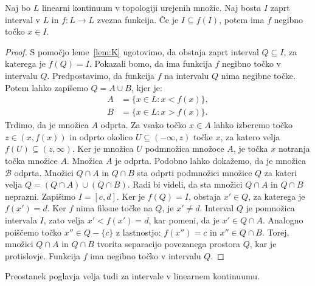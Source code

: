 \documentclass[../TG_magistrsko_delo_sections.tex]{subfiles}
\begin{document}
\begin{lema}
Naj bo $L$ linearni kontinuum v topologiji urejenih množic. Naj bosta $I$ zaprt interval v $L$ in $f:L \to L$ zvezna funkcija. Če je $I \subseteq f(I)$, potem ima $f$ negibno točko $x \in I$.
\end{lema}
\begin{proof}
S pomočjo leme~\ref{lem:K} ugotovimo, da obstaja zaprt interval $Q \subseteq I$, za katerega je $f(Q) = I$. Pokazali bomo, da ima funkcija $f$ negibno točko v intervalu $Q$. Predpostavimo, da funkcija $f$ na intervalu $Q$ nima negibne točke. Potem lahko zapišemo $Q = A \cup B$, kjer je:
\begin{equation*} %
\begin{split}
A &= \{x \in L : x < f(x)\}, \\ 
B &= \{x \in L : x > f(x)\}.
\end{split}
\end{equation*}
Trdimo, da je množica $A$ odprta. Za vsako točko $x \in A$ lahko izberemo točko $z \in (x, f(x))$ in odprto okolico $U \subseteq  (-\infty, z)$ točke $x$, za katero velja $f(U) \subseteq (z, \infty)$. Ker je množica $U$ podmnožica množoce $A$, je točka $x$ notranja točka množice $A$. Množica $A$ je odprta. Podobno lahko dokažemo, da je množica $\mathcal{B}$ odprta. Množici $Q \cap A$ in $Q \cap B$ sta odprti podmnožici množice $Q$ za kateri velja $Q = (Q \cap A) \cup (Q \cap B)$. Radi bi videli, da sta množici $Q \cap A$ in $Q \cap B$ neprazni. Zapišimo $I = [c, d]$. Ker je $f(Q) = I$, obstaja $x' \in Q$, za katerega je $f(x') =d$. Ker $f$ nima fiksne točke na $Q$, je $x' \neq d$. Interval $Q$ je pomnožica intervala $I$, zato velja $x' < f(x') = d$, kar pomeni, da je $x' \in Q \cap A$. Analogno poiščemo točko $x'' \in Q - \{c\}$ z lastnostjo: $f(x'') = c$ in $x'' \in Q \cap B$. Torej, množici $Q \cap A$ in $Q \cap B$ tvorita separacijo povezanega prostora $Q$, kar je protislovje. Funkcija $f$ ima negibno točko v intervalu $Q$.
\end{proof}

Preostanek poglavja velja tudi za intervale v linearnem kontinuumu.
\end{document}
